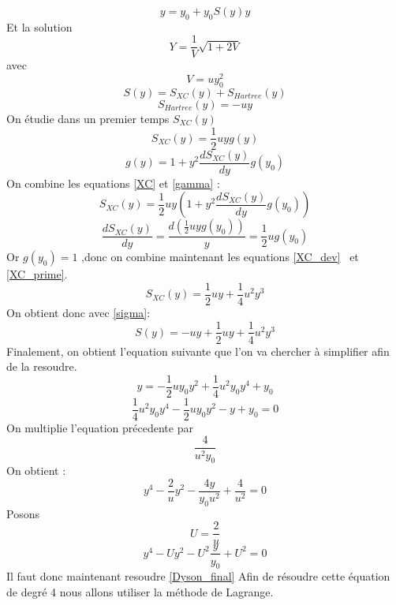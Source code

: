 \documentclass[12pt]{article}
\begin{document}
\begin{equation}
	y = y_0 + y_0 S(y) y
\end{equation}
Et la solution 
\begin{equation}
	Y = \frac{1}{V} \sqrt{1+2V} 
\end{equation}
avec
\begin{equation}
	V = uy_0^2
\end{equation}
\begin{equation}
\label{sigma}
	S(y) = S_{XC}(y) + S_{Hartree}(y)
\end{equation}
\begin{equation}
\label{Hartree} 
	S_{Hartree}(y) = -uy
\end{equation}
On étudie dans un premier temps $S_{XC}(y)$ 
\begin{equation}
\label{XC} 
	S_{XC}(y) = \frac{1}{2} u y g(y)
\end{equation}
\begin{equation} 
\label{gamma} 
	g(y) = 1 + y^2 \frac{dS_{XC}(y)}{dy} g(y_0)
\end{equation}
On combine les equations \ref{XC} et \ref{gamma} : 
\begin{equation} 
\label{XC_dev}
	S_{XC}(y) = \frac{1}{2} u y (1 + y^2 \frac{dS_{XC}(y)}{dy} g(y_0))
\end{equation}
\begin{equation} 
\label{XC_prime} 
	\frac{dS_{XC}(y)}{dy} = \frac{d(\frac{1}{2} u y g(y_0))}{y} = \frac{1}{2} u g(y_0)
\end{equation}
Or $g(y_0) = 1$ ,donc on combine maintenant les equations \ref{XC_dev}  et \ref{XC_prime}.
\begin{equation}
\label{XC_final} 
	S_{XC}(y) = \frac{1}{2} u y + \frac{1}{4} u^2 y^3 
\end{equation}
On obtient donc avec \ref{sigma}: 
\begin{equation}
\label{Sigma_final} 
	S(y) = -uy +  \frac{1}{2} u y + \frac{1}{4} u^2 y^3 
\end{equation}
Finalement, on obtient l'equation suivante que l'on va chercher à simplifier afin de la resoudre.
\begin{equation}
	y = -\frac{1}{2} u y_0 y^2 + \frac{1}{4} u^2 y_0 y^4 + y_0
\end{equation}
\begin{equation}
	\frac{1}{4} u^2 y_0 y^4 -\frac{1}{2} u y_0 y^2 - y + y_0 = 0
\end{equation}
On multiplie l'equation précedente par $$ \frac{4}{u^2 y_0}$$
On obtient : 
\begin{equation}
	y^4 -\frac{2}{u} y^2 - \frac{4y}{y_0  u^2} + \frac{4}{u^2} = 0
\end{equation}
Posons $$ U = \frac{2}{u}$$
\begin{equation}
\label{Dyson_final} 
	y^4 - U y^2 - U^2\frac{y}{y_0} + U^2 = 0
\end{equation}
Il faut donc maintenant resoudre \ref{Dyson_final}
%
Afin de résoudre cette équation de degré 4 nous allons utiliser la m\'ethode de Lagrange.
\end{document}
